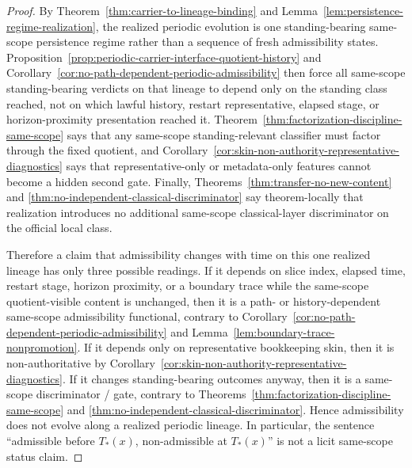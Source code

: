 \begin{proof}
By Theorem~\ref{thm:carrier-to-lineage-binding} and Lemma~\ref{lem:persistence-regime-realization}, the realized periodic evolution is one standing-bearing same-scope persistence regime rather than a sequence of fresh admissibility states. Proposition~\ref{prop:periodic-carrier-interface-quotient-history} and Corollary~\ref{cor:no-path-dependent-periodic-admissibility} then force all same-scope standing-bearing verdicts on that lineage to depend only on the standing class reached, not on which lawful history, restart representative, elapsed stage, or horizon-proximity presentation reached it. Theorem~\ref{thm:factorization-discipline-same-scope} says that any same-scope standing-relevant classifier must factor through the fixed quotient, and Corollary~\ref{cor:skin-non-authority-representative-diagnostics} says that representative-only or metadata-only features cannot become a hidden second gate. Finally, Theorems~\ref{thm:transfer-no-new-content} and \ref{thm:no-independent-classical-discriminator} say theorem-locally that realization introduces no additional same-scope classical-layer discriminator on the official local class.

Therefore a claim that admissibility changes with time on this one realized lineage has only three possible readings. If it depends on slice index, elapsed time, restart stage, horizon proximity, or a boundary trace while the same-scope quotient-visible content is unchanged, then it is a path- or history-dependent same-scope admissibility functional, contrary to Corollary~\ref{cor:no-path-dependent-periodic-admissibility} and Lemma~\ref{lem:boundary-trace-nonpromotion}. If it depends only on representative bookkeeping skin, then it is non-authoritative by Corollary~\ref{cor:skin-non-authority-representative-diagnostics}. If it changes standing-bearing outcomes anyway, then it is a same-scope discriminator / gate, contrary to Theorems~\ref{thm:factorization-discipline-same-scope} and \ref{thm:no-independent-classical-discriminator}. Hence admissibility does not evolve along a realized periodic lineage. In particular, the sentence ``admissible before $T_*(x)$, non-admissible at $T_*(x)$'' is not a licit same-scope status claim.
\end{proof}

